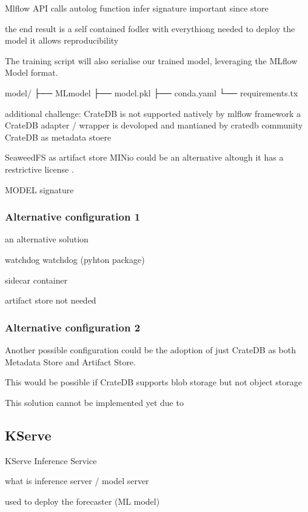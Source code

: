 Mlflow API calls
autolog function
infer signature 
important since store 

the end result is a self contained fodler with everythiong needed to deploy the model
it allows reproducibility 

The training script will also serialise our trained model, leveraging the MLflow Model format.


model/
├── MLmodel
├── model.pkl
├── conda.yaml
└── requirements.tx


additional challenge: CrateDB is not supported natively by mlflow framework
a CrateDB adapter / wrapper is devoloped and mantianed by cratedb community
CrateDB as metadata stoere


SeaweedFS as artifact store
MINio could be an alternative altough it has a restrictive license \cite{minio_license}.



MODEL signature




\subsubsection{Alternative configuration 1}

an alternative solution

watchdog
watchdog (pyhton package)

sidecar container

artifact store not needed

\subsubsection{Alternative configuration 2}

Another possible configuration could be the adoption of just CrateDB as both Metadata Store and Artifact Store.

This would be possible if
CrateDB supports blob storage but not object storage

This solution cannot be implemented yet due to 


\subsection{KServe}


KServe Inference Service

what is
inference server / model server


used to deploy the forecaster (ML model)


